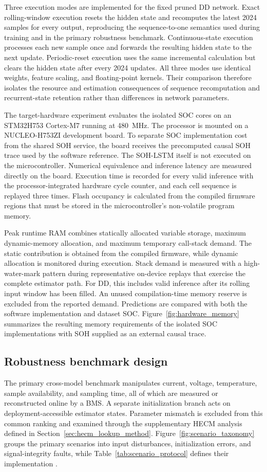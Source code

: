 \documentclass[review,nopreprintline]{elsarticle}
\begin{document}
Three execution modes are implemented for the fixed pruned DD network. Exact rolling-window execution resets the hidden state and recomputes the latest 2024 samples for every output, reproducing the sequence-to-one semantics used during training and in the primary robustness benchmark. Continuous-state execution processes each new sample once and forwards the resulting hidden state to the next update. Periodic-reset execution uses the same incremental calculation but clears the hidden state after every 2024 updates. All three modes use identical weights, feature scaling, and floating-point kernels. Their comparison therefore isolates the resource and estimation consequences of sequence recomputation and recurrent-state retention rather than differences in network parameters.

The target-hardware experiment evaluates the isolated SOC cores on an STM32H753 Cortex-M7 running at \SI{480}{MHz}. The processor is mounted on a NUCLEO-H753ZI development board. To separate SOC implementation cost from the shared SOH service, the board receives the precomputed causal SOH trace used by the software reference. The SOH-LSTM itself is not executed on the microcontroller. Numerical equivalence and inference latency are measured directly on the board. Execution time is recorded for every valid inference with the processor-integrated hardware cycle counter, and each cell sequence is replayed three times. Flash occupancy is calculated from the compiled firmware regions that must be stored in the microcontroller's non-volatile program memory.

Peak runtime RAM combines statically allocated variable storage, maximum dynamic-memory allocation, and maximum temporary call-stack demand. The static contribution is obtained from the compiled firmware, while dynamic allocation is monitored during execution. Stack demand is measured with a high-water-mark pattern during representative on-device replays that exercise the complete estimator path. For DD, this includes valid inference after its rolling input window has been filled. An unused compilation-time memory reserve is excluded from the reported demand. Predictions are compared with both the software implementation and dataset SOC. Figure~\ref{fig:hardware_memory} summarizes the resulting memory requirements of the isolated SOC implementations with SOH supplied as an external causal trace.

\subsection{Robustness benchmark design}
The primary cross-model benchmark manipulates current, voltage, temperature, sample availability, and sampling time, all of which are measured or reconstructed online by a BMS. A separate initialization branch acts on deployment-accessible estimator states. Parameter mismatch is excluded from this common ranking and examined through the supplementary HECM analysis defined in Section~\ref{sec:hecm_lookup_method}. Figure~\ref{fig:scenario_taxonomy} groups the primary scenarios into input disturbances, initialization errors, and signal-integrity faults, while Table~\ref{tab:scenario_protocol} defines their implementation \cite{bergerBenchmarkingBatteryManagement2024}.
\end{document}
